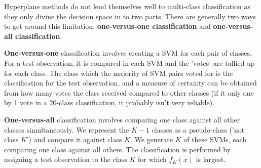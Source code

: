 Hyperplane methods do not lend themselves well to multi-class classification as they only divine the decision space in to two parts. There are generally two ways to get around this limitation: \textbf{one-versus-one classification} and \textbf{one-versus-all classification}.

\textbf{One-versus-one} classification involves creating a SVM for each pair of classes. For a test observation, it is compared in each SVM and the 'votes' are tallied up for each class. The class which the majority of SVM pairs voted for is the classification for the test observation, and a measure of certainty can be obtained from how many votes the class received compared to other classes (if it only one by 1 vote in a 20-class classification, it probably isn't very reliable).

\textbf{One-versus-all} classification involves comparing one class against all other classes simultaneously. We represent the $K-1$ classes as a pseudo-class ('not class $K$') and compare it against class $K$. We generate $K$ of these SVMs, each comparing one class against all others. The classification is performed by assigning a test observation to the class $K$ for which $f_{K}(x)$ is largest.
